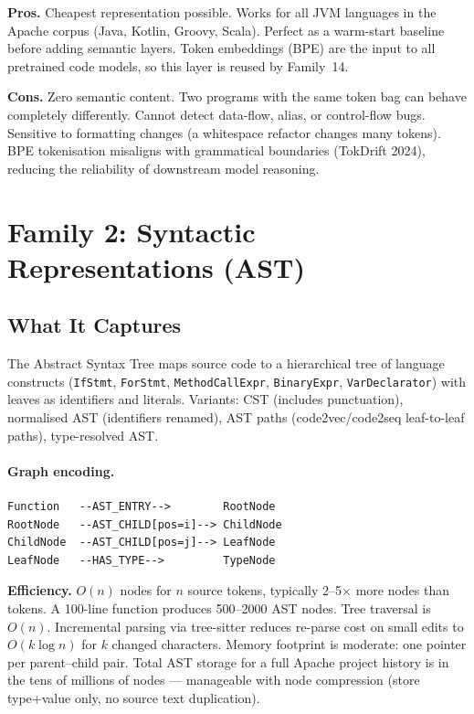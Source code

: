 \documentclass[12pt,a4paper]{article}
\begin{document}
\begin{prosbox}
\textbf{Pros.}
Cheapest representation possible. Works for all JVM languages in the Apache
corpus (Java, Kotlin, Groovy, Scala). Perfect as a warm-start baseline before
adding semantic layers. Token embeddings (BPE) are the input to all pretrained
code models, so this layer is reused by Family~14.
\end{prosbox}

\begin{consbox}
\textbf{Cons.}
Zero semantic content. Two programs with the same token bag can behave
completely differently. Cannot detect data-flow, alias, or control-flow bugs.
Sensitive to formatting changes (a whitespace refactor changes many tokens).
BPE tokenisation misaligns with grammatical boundaries (TokDrift 2024), reducing
the reliability of downstream model reasoning.
\end{consbox}

\section{Family 2: Syntactic Representations (AST)}

\subsection{What It Captures}

The Abstract Syntax Tree maps source code to a hierarchical tree of language
constructs (\texttt{IfStmt}, \texttt{ForStmt}, \texttt{MethodCallExpr},
\texttt{BinaryExpr}, \texttt{VarDeclarator}) with leaves as identifiers and
literals. Variants: CST (includes punctuation), normalised AST (identifiers
renamed), AST paths (code2vec/code2seq leaf-to-leaf paths), type-resolved AST.

\paragraph{Graph encoding.}
\begin{lstlisting}
Function   --AST_ENTRY-->        RootNode
RootNode   --AST_CHILD[pos=i]--> ChildNode
ChildNode  --AST_CHILD[pos=j]--> LeafNode
LeafNode   --HAS_TYPE-->         TypeNode
\end{lstlisting}

\begin{effbox}
\textbf{Efficiency.}
$O(n)$ nodes for $n$ source tokens, typically 2--5$\times$ more nodes than
tokens. A 100-line function produces 500--2000 AST nodes. Tree traversal is
$O(n)$. Incremental parsing via tree-sitter reduces re-parse cost on small edits
to $O(k \log n)$ for $k$ changed characters. Memory footprint is moderate: one
pointer per parent--child pair. Total AST storage for a full Apache project
history is in the tens of millions of nodes --- manageable with node compression
(store type+value only, no source text duplication).
\end{effbox}
\end{document}
